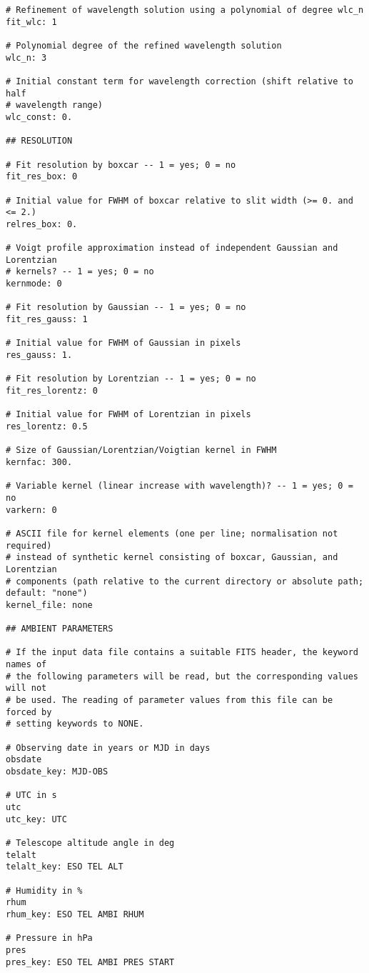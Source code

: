 {\begin{verbatim}
# Refinement of wavelength solution using a polynomial of degree wlc_n
fit_wlc: 1

# Polynomial degree of the refined wavelength solution
wlc_n: 3

# Initial constant term for wavelength correction (shift relative to half
# wavelength range)
wlc_const: 0.

## RESOLUTION

# Fit resolution by boxcar -- 1 = yes; 0 = no
fit_res_box: 0

# Initial value for FWHM of boxcar relative to slit width (>= 0. and <= 2.)
relres_box: 0.

# Voigt profile approximation instead of independent Gaussian and Lorentzian
# kernels? -- 1 = yes; 0 = no
kernmode: 0

# Fit resolution by Gaussian -- 1 = yes; 0 = no
fit_res_gauss: 1

# Initial value for FWHM of Gaussian in pixels
res_gauss: 1.

# Fit resolution by Lorentzian -- 1 = yes; 0 = no
fit_res_lorentz: 0

# Initial value for FWHM of Lorentzian in pixels
res_lorentz: 0.5

# Size of Gaussian/Lorentzian/Voigtian kernel in FWHM
kernfac: 300.

# Variable kernel (linear increase with wavelength)? -- 1 = yes; 0 = no
varkern: 0

# ASCII file for kernel elements (one per line; normalisation not required)
# instead of synthetic kernel consisting of boxcar, Gaussian, and Lorentzian
# components (path relative to the current directory or absolute path; default: "none")
kernel_file: none

## AMBIENT PARAMETERS

# If the input data file contains a suitable FITS header, the keyword names of
# the following parameters will be read, but the corresponding values will not
# be used. The reading of parameter values from this file can be forced by
# setting keywords to NONE.

# Observing date in years or MJD in days
obsdate
obsdate_key: MJD-OBS

# UTC in s
utc
utc_key: UTC

# Telescope altitude angle in deg
telalt
telalt_key: ESO TEL ALT

# Humidity in %
rhum
rhum_key: ESO TEL AMBI RHUM

# Pressure in hPa
pres
pres_key: ESO TEL AMBI PRES START


\end{verbatim}}
